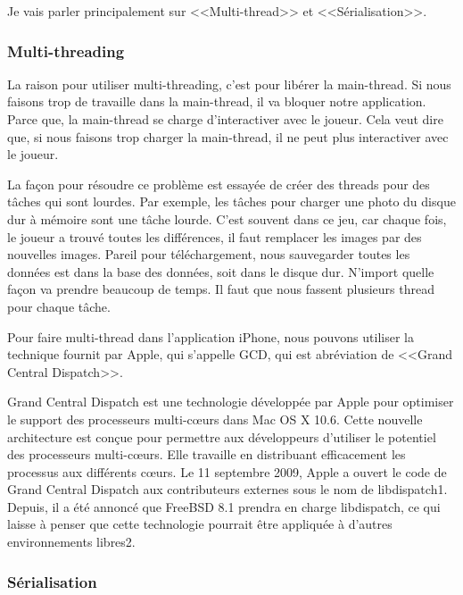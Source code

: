 Je vais parler principalement sur <<Multi-thread>> et <<Sérialisation>>.

\subsubsection{Multi-threading} %
\label{ssub:multi_thread}

La raison pour utiliser multi-threading, c'est pour libérer la main-thread. Si nous faisons trop de travaille dans la main-thread, il va bloquer notre application. Parce que, la main-thread se charge d'interactiver avec le joueur. Cela veut dire que, si nous faisons trop charger la main-thread, il ne peut plus interactiver avec le joueur. 

La façon pour résoudre ce problème est essayée de créer des threads pour des tâches qui sont lourdes. Par exemple, les tâches pour charger une photo du disque dur à mémoire sont une tâche lourde. C'est souvent dans ce jeu, car chaque fois, le joueur a trouvé toutes les différences, il faut remplacer les images par des nouvelles images. Pareil pour téléchargement, nous sauvegarder toutes les données est dans la base des données, soit dans le disque dur. N'import quelle façon va prendre beaucoup de temps. Il faut que nous fassent plusieurs thread pour chaque tâche.

Pour faire multi-thread dans l'application iPhone, nous pouvons utiliser la technique fournit par Apple, qui s'appelle GCD, qui est abréviation de <<Grand Central Dispatch>>.


Grand Central Dispatch est une technologie développée par Apple pour optimiser le support des processeurs multi-cœurs dans Mac OS X 10.6.
Cette nouvelle architecture est conçue pour permettre aux développeurs d'utiliser le potentiel des processeurs multi-cœurs. Elle travaille en distribuant efficacement les processus aux différents cœurs.
Le 11 septembre 2009, Apple a ouvert le code de Grand Central Dispatch aux contributeurs externes sous le nom de libdispatch1. Depuis, il a été annoncé que FreeBSD 8.1 prendra en charge libdispatch, ce qui laisse à penser que cette technologie pourrait être appliquée à d'autres environnements libres2.



\subsubsection{Sérialisation} %
\label{ssub:sérialisation}

